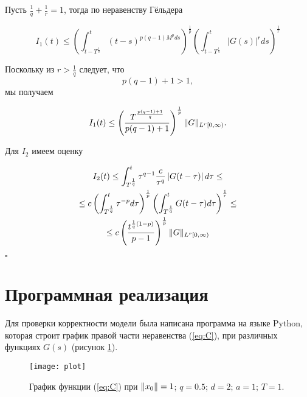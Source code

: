 \noindent Пусть $\frac{1}{q} + \frac{1}{r} = 1$, тогда по неравенству Гёльдера

\begin{equation*}
    I_1(t) \leq \left( \int_{t-T^{\frac{1}{q}}}^t (t-s)^{p(q-1)M^p ds} \right)^{\frac{1}{p}}
    \left( \int_{t-T^{\frac{1}{q}}}^t \left|G(s)\right|^r ds \right)^{\frac{1}{r}}
\end{equation*}

\noindent Поскольку из $r > \frac{1}{q}$ следует, что
$$p(q-1) + 1 > 1,$$
мы получаем

\begin{equation*}
    I_1(t) \leq \left( \frac{T^{\frac{p(q-1)+1}{q}}}{p(q-1)+1} \right)^{\frac{1}{p}} \lVert G\rVert_{L^r [0, \infty)}.
\end{equation*}

\noindent Для $I_2$ имеем оценку

\begin{equation*}
    \begin{gathered}
        I_2(t) \leq \int_{T^{\frac{1}{q}}}^t \tau^{q-1} \frac{c}{\tau^q} \left| G(t- \tau) \right| d\tau \leq \\
        \leq c \left( \int_{T^{\frac{1}{q}}}^t \tau^{-p} d\tau \right)^{\frac{1}{p}}
        \left( \int_{T^{\frac{1}{q}}}^{t} G(t - \tau) d\tau \right)^{\frac{1}{r}} \leq \\
        \leq c \left( \frac{t^{\frac{1}{q}(1-p)}}{p-1} \right)^{\frac{1}{p}} \lVert G\rVert_{L^r[0, \infty)}
    \end{gathered}
\end{equation*}

\begin{flushright}
$\square$
\end{flushright}

\section{Программная реализация}

Для проверки корректности модели была написана программа на языке Python, которая строит график правой части неравенства (\ref{eq:C}),
при различных функциях $G(s)$ (рисунок \ref{fig:plot}).

\begin{figure}[ht]
    \centering
    \texttt{[image: plot]}
    \caption{График функции (\ref{eq:C}) при $\lVert x_0\rVert = 1$; $q = 0.5$; $d = 2$; $a = 1$; $T = 1$.}
    \label{fig:plot}
\end{figure}


